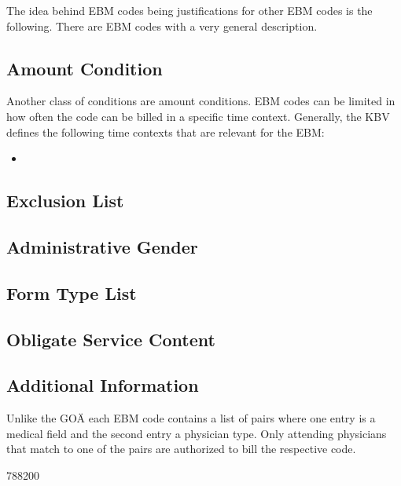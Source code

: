 The idea behind EBM codes being justifications for other EBM codes is the following.
There are EBM codes with a very general description.

\subsection{Amount Condition}

Another class of conditions are amount conditions.
EBM codes can be limited in how often the code can be billed in a specific time context.
Generally, the KBV defines the following time contexts that are relevant for the EBM:
\begin{itemize}
    \item
\end{itemize}


\subsection{Exclusion List}

\subsection{Administrative Gender}

\subsection{Form Type List}

\subsection{Obligate Service Content}

\subsection{Additional Information}

Unlike the GOÄ each EBM code contains a list of pairs where one entry is a medical field and the second entry a physician type.
Only attending physicians that match to one of the pairs are authorized to bill the respective code.


788200